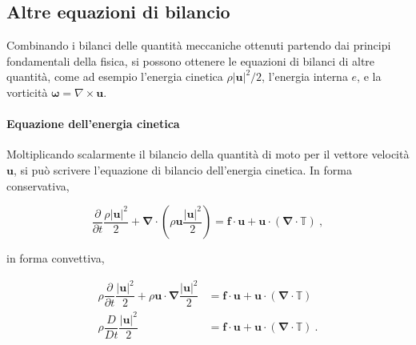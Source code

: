 \subsection{Altre equazioni di bilancio}
Combinando i bilanci delle quantità meccaniche ottenuti partendo dai principi fondamentali della fisica, si possono ottenere le equazioni di bilanci di altre quantità, come ad esempio l'energia cinetica $\rho|\bm{u}|^2/2$, l'energia interna $e$, e la vorticità $\bm{\omega} = \nabla \times \bm{u}$.
\paragraph{Equazione dell'energia cinetica} Moltiplicando scalarmente il bilancio della quantità di moto per il vettore velocità $\bm{u}$, si può scrivere l'equazione di bilancio dell'energia cinetica. In forma conservativa,
\begin{fBox}
\begin{equation}
 \dfrac{\partial}{\partial t}\dfrac{\rho|\bm{u}|^2}{2}  + \bm{\nabla} \cdot \left( \rho \bm{u} \dfrac{|\bm{u}|^2}{2} \right) = \bm{f} \cdot \bm{u} + \bm{u} \cdot ( \bm{\nabla} \cdot \mathbb{T} ) \ ,
\end{equation}
\end{fBox}
in forma convettiva,
\begin{fBox}
 \begin{equation}
  \begin{aligned}
   \rho \dfrac{\partial}{\partial t} \dfrac{|\bm{u}|^2}{2} +  \rho \bm{u}  \cdot \bm{\nabla} \dfrac{|\bm{u}|^2}{2} & = \bm{f} \cdot \bm{u} + \bm{u} \cdot (\bm{\nabla} \cdot \mathbb{T} ) \\ 
   \rho \dfrac{D }{D t}\dfrac{|\bm{u}|^2}{2} & = \bm{f}\cdot \bm{u} + \bm{u} \cdot ( \bm{\nabla} \cdot \mathbb{T} ) \ . \\ 
  \end{aligned}
 \end{equation}
\end{fBox}

